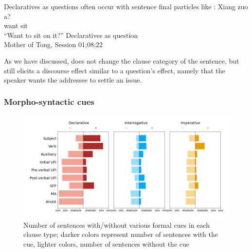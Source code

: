 Declaratives as questions often occur with sentence final particles like :
\gll %
Xiang zuo a?\\
want sit \Sfp{}\\
``Want to sit on it?''
\hfill Declaratives as question\\
Mother of Tong, Session 01;08;22
\eex

As we have discussed,  does not change the clause category of the sentence, but still elicits a discourse effect similar to a question's effect, namely that the speaker wants the addressee to settle an issue.


\subsubsection{Morpho-syntactic cues}
\label{sec:mancl:corpus:results:syn}


\begin{figure}[H]
    \centering
    \includegraphics[width=1\textwidth]{figures/man-real-syncluster.jpg}
    \caption{Number of sentences with/without various formal cues in each clause type; darker colors represent number of sentences with the cue, lighter colors, number of sentences without the cue }
    \label{fig:man-real-syncluster}
\end{figure}




